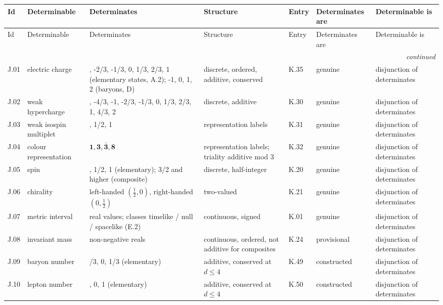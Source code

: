 {\scriptsize\setlength{\tabcolsep}{3pt}
\begin{longtable}{@{}l>{\raggedright\arraybackslash}p{2.3cm}>{\raggedright\arraybackslash}p{4.5cm}>{\raggedright\arraybackslash}p{2.9cm}l>{\raggedright\arraybackslash}p{1.6cm}>{\raggedright\arraybackslash}p{1.7cm}@{}}
\toprule
Id & Determinable & Determinates & Structure & Entry & Determinates are & Determinable is \\
\midrule\endfirsthead
\toprule
Id & Determinable & Determinates & Structure & Entry & Determinates are & Determinable is \\
\midrule\endhead
\midrule\multicolumn{7}{r}{\emph{continued}}\\\endfoot
\bottomrule\endlastfoot
J.01 & electric charge & -1, -2/3, -1/3, 0, 1/3, 2/3, 1 (elementary states, A.2); -1, 0, 1, 2 (baryons, D) & discrete, ordered, additive, conserved & K.35 & genuine & disjunction of determinates \\
J.02 & weak hypercharge & -2, -4/3, -1, -2/3, -1/3, 0, 1/3, 2/3, 1, 4/3, 2 & discrete, additive & K.30 & genuine & disjunction of determinates \\
J.03 & weak isospin multiplet & 0, 1/2, 1 & representation labels & K.31 & genuine & disjunction of determinates \\
J.04 & colour representation & $\mathbf 1,\mathbf 3,\bar{\mathbf 3},\mathbf 8$ & representation labels; triality additive mod 3 & K.32 & genuine & disjunction of determinates \\
J.05 & spin & 0, 1/2, 1 (elementary); 3/2 and higher (composite) & discrete, half-integer & K.20 & genuine & disjunction of determinates \\
J.06 & chirality & left-handed $(\frac12,0)$, right-handed $(0,\frac12)$ & two-valued & K.21 & genuine & disjunction of determinates \\
J.07 & metric interval & real values; classes timelike / null / spacelike (E.2) & continuous, signed & K.01 & genuine & disjunction of determinates \\
J.08 & invariant mass & non-negative reals & continuous, ordered, not additive for composites & K.24 & provisional & disjunction of determinates \\
J.09 & baryon number & -1/3, 0, 1/3 (elementary) & additive, conserved at $d\le 4$ & K.49 & constructed & disjunction of determinates \\
J.10 & lepton number & -1, 0, 1 (elementary) & additive, conserved at $d\le 4$ & K.50 & constructed & disjunction of determinates \\

\end{longtable}}
